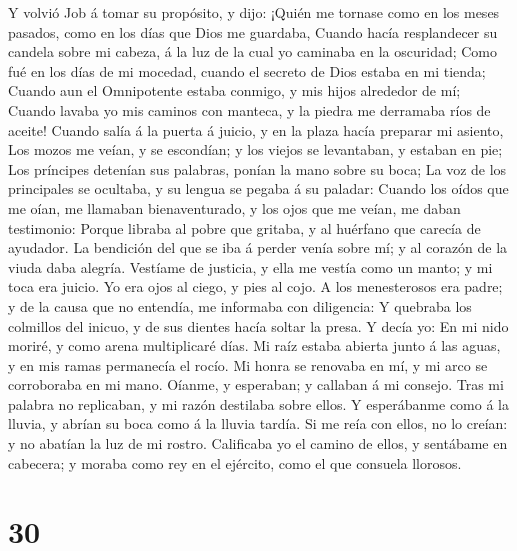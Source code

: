  Y volvió Job á tomar su propósito, y dijo: 
¡Quién me tornase como en los meses pasados, como en los días que Dios
me guardaba,  Cuando hacía resplandecer su candela sobre
mi cabeza, á la luz de la cual yo caminaba en la oscuridad;
 Como fué en los días de mi mocedad, cuando el secreto de
Dios estaba en mi tienda;  Cuando aun el Omnipotente
estaba conmigo, y mis hijos alrededor de mí;  Cuando
lavaba yo mis caminos con manteca, y la piedra me derramaba ríos de
aceite!  Cuando salía á la puerta á juicio, y en la plaza
hacía preparar mi asiento,  Los mozos me veían, y se
escondían; y los viejos se levantaban, y estaban en pie; 
Los príncipes detenían sus palabras, ponían la mano sobre su boca;
 La voz de los principales se ocultaba, y su lengua se
pegaba á su paladar:  Cuando los oídos que me oían, me
llamaban bienaventurado, y los ojos que me veían, me daban testimonio:
 Porque libraba al pobre que gritaba, y al huérfano que
carecía de ayudador.  La bendición del que se iba á
perder venía sobre mí; y al corazón de la viuda daba alegría.
 Vestíame de justicia, y ella me vestía como un manto; y
mi toca era juicio.  Yo era ojos al ciego, y pies al
cojo.  A los menesterosos era padre; y de la causa que no
entendía, me informaba con diligencia:  Y quebraba los
colmillos del inicuo, y de sus dientes hacía soltar la presa.
 Y decía yo: En mi nido moriré, y como arena multiplicaré
días.  Mi raíz estaba abierta junto á las aguas, y en mis
ramas permanecía el rocío.  Mi honra se renovaba en mí, y
mi arco se corroboraba en mi mano.  Oíanme, y esperaban;
y callaban á mi consejo.  Tras mi palabra no replicaban,
y mi razón destilaba sobre ellos.  Y esperábanme como á
la lluvia, y abrían su boca como á la lluvia tardía.  Si
me reía con ellos, no lo creían: y no abatían la luz de mi rostro.
 Calificaba yo el camino de ellos, y sentábame en
cabecera; y moraba como rey en el ejército, como el que consuela
llorosos.

\hypertarget{section-29}{%
\section{30}\label{section-29}}


